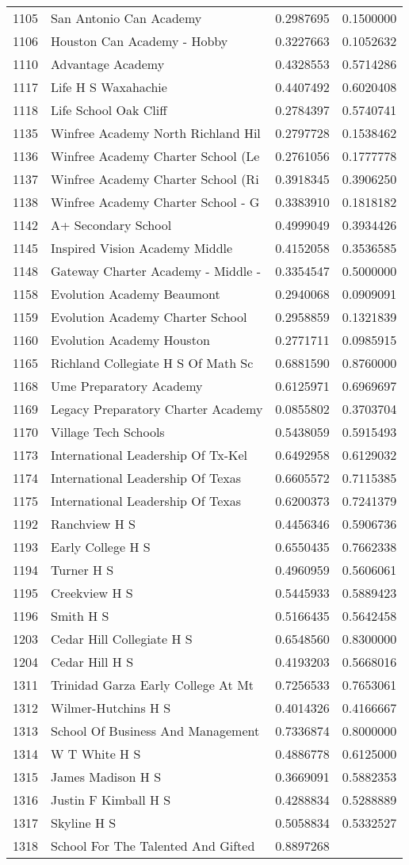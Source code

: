 \documentclass[
]{article}
\begin{document}
\begin{longtable}[]{@{}llrr@{}}
1105 & San Antonio Can Academy & 0.2987695 & 0.1500000\tabularnewline
1106 & Houston Can Academy - Hobby & 0.3227663 &
0.1052632\tabularnewline
1110 & Advantage Academy & 0.4328553 & 0.5714286\tabularnewline
1117 & Life H S Waxahachie & 0.4407492 & 0.6020408\tabularnewline
1118 & Life School Oak Cliff & 0.2784397 & 0.5740741\tabularnewline
1135 & Winfree Academy North Richland Hil & 0.2797728 &
0.1538462\tabularnewline
1136 & Winfree Academy Charter School (Le & 0.2761056 &
0.1777778\tabularnewline
1137 & Winfree Academy Charter School (Ri & 0.3918345 &
0.3906250\tabularnewline
1138 & Winfree Academy Charter School - G & 0.3383910 &
0.1818182\tabularnewline
1142 & A+ Secondary School & 0.4999049 & 0.3934426\tabularnewline
1145 & Inspired Vision Academy Middle & 0.4152058 &
0.3536585\tabularnewline
1148 & Gateway Charter Academy - Middle - & 0.3354547 &
0.5000000\tabularnewline
1158 & Evolution Academy Beaumont & 0.2940068 & 0.0909091\tabularnewline
1159 & Evolution Academy Charter School & 0.2958859 &
0.1321839\tabularnewline
1160 & Evolution Academy Houston & 0.2771711 & 0.0985915\tabularnewline
1165 & Richland Collegiate H S Of Math Sc & 0.6881590 &
0.8760000\tabularnewline
1168 & Ume Preparatory Academy & 0.6125971 & 0.6969697\tabularnewline
1169 & Legacy Preparatory Charter Academy & 0.0855802 &
0.3703704\tabularnewline
1170 & Village Tech Schools & 0.5438059 & 0.5915493\tabularnewline
1173 & International Leadership Of Tx-Kel & 0.6492958 &
0.6129032\tabularnewline
1174 & International Leadership Of Texas & 0.6605572 &
0.7115385\tabularnewline
1175 & International Leadership Of Texas & 0.6200373 &
0.7241379\tabularnewline
1192 & Ranchview H S & 0.4456346 & 0.5906736\tabularnewline
1193 & Early College H S & 0.6550435 & 0.7662338\tabularnewline
1194 & Turner H S & 0.4960959 & 0.5606061\tabularnewline
1195 & Creekview H S & 0.5445933 & 0.5889423\tabularnewline
1196 & Smith H S & 0.5166435 & 0.5642458\tabularnewline
1203 & Cedar Hill Collegiate H S & 0.6548560 & 0.8300000\tabularnewline
1204 & Cedar Hill H S & 0.4193203 & 0.5668016\tabularnewline
1311 & Trinidad Garza Early College At Mt & 0.7256533 &
0.7653061\tabularnewline
1312 & Wilmer-Hutchins H S & 0.4014326 & 0.4166667\tabularnewline
1313 & School Of Business And Management & 0.7336874 &
0.8000000\tabularnewline
1314 & W T White H S & 0.4886778 & 0.6125000\tabularnewline
1315 & James Madison H S & 0.3669091 & 0.5882353\tabularnewline
1316 & Justin F Kimball H S & 0.4288834 & 0.5288889\tabularnewline
1317 & Skyline H S & 0.5058834 & 0.5332527\tabularnewline
1318 & School For The Talented And Gifted & 0.8897268 &

\end{longtable}
\end{document}

